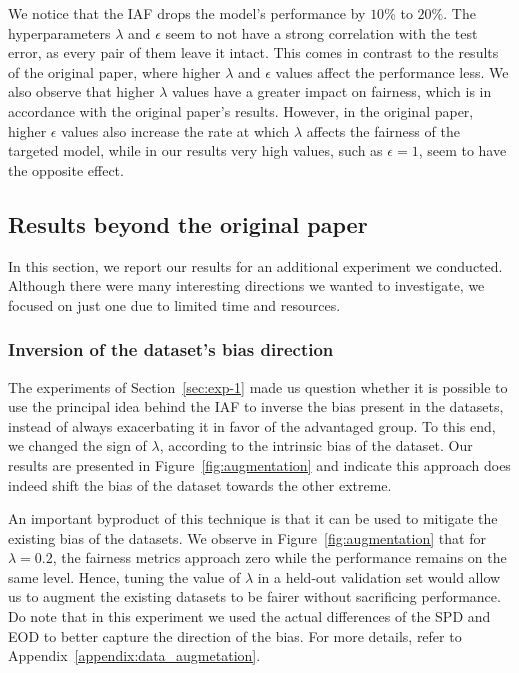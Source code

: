 We notice that the IAF drops the model's performance by $10\%$ to $20\%$. The hyperparameters $\lambda$ and $\epsilon$ seem to not have a strong correlation with the test error, as every pair of them leave it intact. This comes in contrast to the results of the original paper, where higher $\lambda$ and $\epsilon$ values affect the performance less. We also observe that higher $\lambda$ values have a greater impact on fairness, which is in accordance with the original paper's results. However, in the original paper, higher $\epsilon$ values also increase the rate at which $\lambda$ affects the fairness of the targeted model, while in our results very high values, such as $\epsilon = 1$, seem to have the opposite effect.

\subsection{Results beyond the original paper}
In this section, we report our results for an additional experiment we conducted. Although there were many interesting directions we wanted to investigate, we focused on just one due to limited time and resources.

\subsubsection{Inversion of the dataset's bias direction}
The experiments of Section~\ref{sec:exp-1} made us question whether it is possible to use the principal idea behind the IAF to inverse the bias present in the datasets, instead of always exacerbating it in favor of the advantaged group. To this end, we changed the sign of $\lambda$, according to the intrinsic bias of the dataset. Our results are presented in Figure~\ref{fig:augmentation} and indicate this approach does indeed shift the bias of the dataset towards the other extreme.

An important byproduct of this technique is that it can be used to mitigate the existing bias of the datasets. We observe in Figure~\ref{fig:augmentation} that for $\lambda = 0.2$, the fairness metrics approach zero while the performance remains on the same level. Hence, tuning the value of $\lambda$ in a held-out validation set would allow us to augment the existing datasets to be fairer without sacrificing performance. Do note that in this experiment we used the actual differences of the SPD and EOD to better capture the direction of the bias. For more details, refer to Appendix~\ref{appendix:data_augmetation}.

